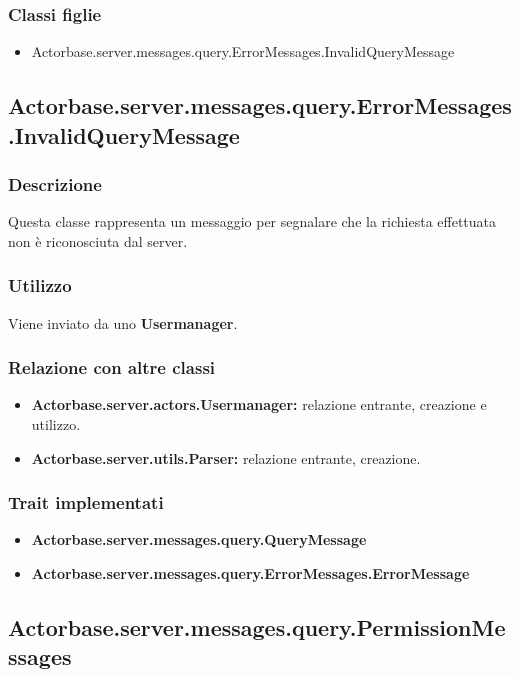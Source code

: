 \documentclass[a4paper]{article}
\begin{document}
			\subsubsection{Classi figlie}
				\begin{itemize}
					\item Actorbase.server.messages.query.ErrorMessages.InvalidQueryMessage
				\end{itemize}
				
		\subsection{Actorbase.server.messages.query.ErrorMessages.InvalidQueryMessage}
			\subsubsection{Descrizione}
				Questa classe rappresenta un messaggio per segnalare che la richiesta effettuata non è riconosciuta dal server.
				
			\subsubsection{Utilizzo}
				Viene inviato da uno \textbf{Usermanager}.
				
			\subsubsection{Relazione con altre classi}
				\begin{itemize}
					\item \textbf{Actorbase.server.actors.Usermanager:} relazione entrante, creazione e utilizzo.
					\item \textbf{Actorbase.server.utils.Parser:} relazione entrante, creazione.
				\end{itemize}
			
			\subsubsection{Trait implementati}
				\begin{itemize}
					\item \textbf{Actorbase.server.messages.query.QueryMessage}
					\item \textbf{Actorbase.server.messages.query.ErrorMessages.ErrorMessage} 
				\end{itemize}

		\subsection{Actorbase.server.messages.query.PermissionMessages}
		
\end{document}
